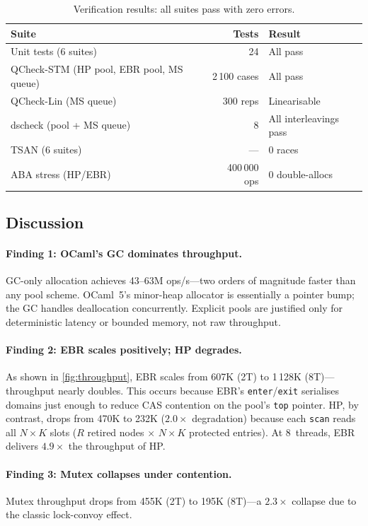 \documentclass[11pt,a4paper]{article}
\begin{document}
\begin{table}[ht]
\centering
\caption{Verification results: all suites pass with zero errors.}
\label{tab:verification}
\begin{tabular}{@{}lrl@{}}
\toprule
\textbf{Suite} & \textbf{Tests} & \textbf{Result} \\
\midrule
Unit tests (6 suites) & 24 & All pass \\
QCheck-STM (HP pool, EBR pool, MS queue) & 2\,100 cases & All pass \\
QCheck-Lin (MS queue) & 300 reps & Linearisable \\
dscheck (pool + MS queue) & 8 & All interleavings pass \\
TSAN (6 suites) & --- & 0 races \\
ABA stress (HP/EBR) & 400\,000 ops & 0 double-allocs \\
\bottomrule
\end{tabular}
\end{table}

\subsection{Discussion}

\paragraph{Finding 1: OCaml's GC dominates throughput.}
GC-only allocation achieves 43--63M ops/s---two orders of magnitude faster
than any pool scheme.  OCaml~5's minor-heap allocator is essentially a
pointer bump; the GC handles deallocation concurrently.  Explicit pools are
justified only for deterministic latency or bounded memory, not raw throughput.

\paragraph{Finding 2: EBR scales positively; HP degrades.}
As shown in \cref{fig:throughput}, EBR scales from 607K (2T) to 1\,128K
(8T)---throughput nearly doubles.  This occurs because EBR's
\texttt{enter}/\texttt{exit} serialises domains just enough to reduce CAS
contention on the pool's \texttt{top} pointer.  HP, by contrast, drops from
470K to 232K ($2.0\times$ degradation) because each \texttt{scan} reads all
$N \times K$ slots ($R$ retired nodes $\times$ $N \times K$ protected entries).
At 8~threads, EBR delivers $4.9\times$ the throughput
of HP.

\paragraph{Finding 3: Mutex collapses under contention.}
Mutex throughput drops from 455K (2T) to 195K (8T)---a $2.3\times$ collapse
due to the classic lock-convoy effect.
\end{document}
